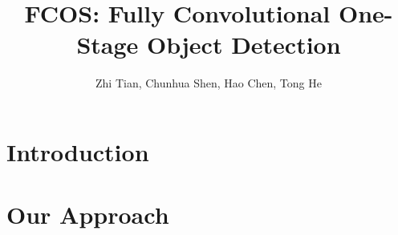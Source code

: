 \documentclass{ctexart}
\title{FCOS: Fully Convolutional One-Stage Object Detection}
\author{Zhi Tian, Chunhua Shen, Hao Chen, Tong He}
\date{}
\begin{document}
\maketitle
\begin{abstract}
    
\end{abstract}
\section{Introduction}

\section{Our Approach}

\printbibliography
\end{document}
